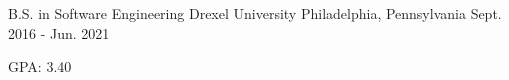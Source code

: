 

\begin{cventries}

  \cventry
    {B.S. in Software Engineering} %
    {Drexel University} %
    {Philadelphia, Pennsylvania} %
    {Sept. 2016 - Jun. 2021} %
    {
      \begin{cvitems} %
        \item GPA: 3.40
      \end{cvitems}
    }

\end{cventries}
